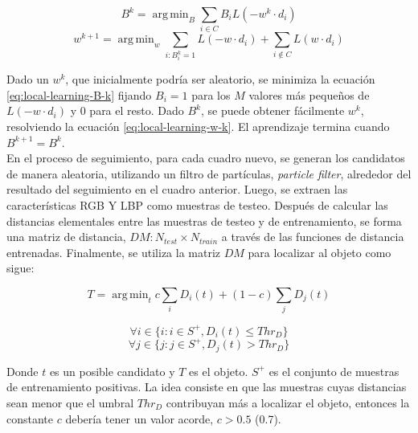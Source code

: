 \documentclass[a4paper,10pt]{article}
\DeclareMathOperator*{\argmin}{arg\,min}
\begin{document}
\begin{equation}
   \label{eq:local-learning-B-k}
   B^{k} = \argmin_{B} \sum_{i \in C} B_{i}L(-w^{k} \cdot d_{i})
\end{equation}
\begin{equation}
    \label{eq:local-learning-w-k}
    w^{k+1} = \argmin_{w} \sum_{i:B_{i}^{k}=1} L(-w \cdot d_{i}) + \sum_{i\notin C}L(w \cdot d_{i})
\end{equation}

Dado un $w^{k}$, que inicialmente podría ser aleatorio, se minimiza la ecuación 
\ref{eq:local-learning-B-k} fijando $B_{i} = 1$ para los $M$ valores más
pequeños de $L(-w \cdot d_{i})$ y $0$ para el resto. Dado $B^{k}$, se puede
obtener fácilmente $w^{k}$, resolviendo la ecuación \ref{eq:local-learning-w-k}. 
El aprendizaje termina cuando $B^{k+1}=B^{k}$.\\

En el proceso de seguimiento, para cada cuadro nuevo, se generan los
candidatos de manera aleatoria, utilizando un filtro de partículas,
\textit{particle filter}, alrededor del resultado del 
seguimiento en el cuadro anterior. Luego, se extraen las características
RGB Y LBP como muestras de testeo. Después de calcular las distancias
elementales entre las muestras de testeo y de entrenamiento, se 
forma una matriz de distancia, $DM: N_{test} \times N_{train}$ a través
de las funciones de distancia entrenadas. Finalmente, se utiliza la 
matriz $DM$ para localizar al objeto como sigue:

\begin{equation}
    T = \argmin_{t} c \sum_{i} D_{i}(t) + (1 - c) \sum_{j} D_{j}(t)
\end{equation}

\begin{equation}
    \forall i \in \{i : i \in S^{+}, D_{i}(t) \leq Thr_{D} \}
\end{equation}
\begin{equation}
    \forall j \in \{j : j \in S^{+}, D_{j}(t) > Thr_{D} \}
\end{equation}

Donde $t$ es un posible candidato y $T$ es el objeto. $S^{+}$ es el 
conjunto de muestras de entrenamiento positivas. La idea consiste en 
que las muestras cuyas distancias sean menor que el umbral $Thr_{D}$
contribuyan más a localizar el objeto, entonces la constante $c$ 
debería tener un valor acorde, $c > 0.5$ (0.7).\\
\end{document}
